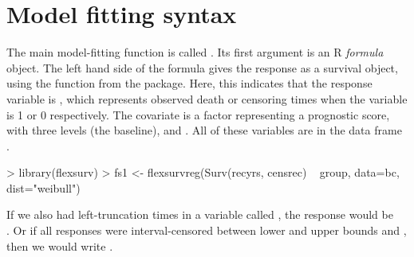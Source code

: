 \documentclass[nojss,nofooter]{jss}
\begin{document}
\section{Model fitting syntax} 

The main model-fitting function is called .  Its
first argument is an R \emph{formula} object.  The left hand side of
the formula gives the response as a survival object, using the
 function from the  package.  Here, this
indicates that the response variable is , which represents
observed death or censoring times when the variable
 is 1 or 0 respectively.  The covariate  is
a factor representing a prognostic score, with three levels
 (the baseline),  and
. All of these variables are in the data frame
.
\begin{Schunk}
\begin{Sinput}
> library(flexsurv)
> fs1 <- flexsurvreg(Surv(recyrs, censrec) ~ group, data=bc, dist="weibull")
\end{Sinput}
\end{Schunk}

If we also had left-truncation times in a variable called
, the response would be \\ .
Or if all responses were interval-censored between lower and upper
bounds  and , then we would write
.
\end{document}
